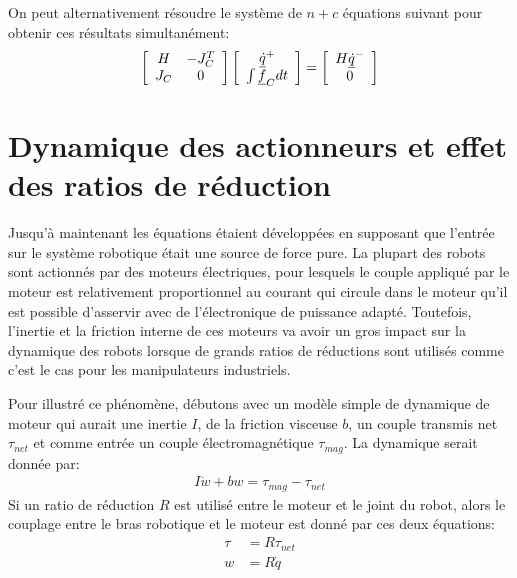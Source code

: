 On peut alternativement résoudre le système de $n+c$ équations suivant pour obtenir ces résultats simultanément:
\begin{align}
\left[ \begin{array}{c c } 	H & -J_C^T  \\ J_C 	& 0  	\end{array} \right] \left[ \begin{array}{c} \underline{\dot{q}}^+  \\ \int{ \underline{f}_C dt }\end{array} \right] = \left[ \begin{array}{c}  	H \underline{\dot{q}}^-   \\ 0  \end{array} \right]
\label{eq:manipulator_impact_eom}
\end{align}



\newpage
\section{Dynamique des actionneurs et effet des ratios de réduction}
\label{sec:actuatordynamic}

Jusqu'à maintenant les équations étaient développées en supposant que l'entrée sur le système robotique était une source de force pure. La plupart des robots sont actionnés par des moteurs électriques, pour lesquels le couple appliqué par le moteur est relativement proportionnel au courant qui circule dans le moteur qu'il est possible d'asservir avec de l'électronique de puissance adapté. Toutefois, l'inertie et la friction interne de ces moteurs va avoir un gros impact sur la dynamique des robots lorsque de grands ratios de réductions sont utilisés comme c'est le cas pour les manipulateurs industriels.

Pour illustré ce phénomène, débutons avec un modèle simple de dynamique de moteur qui aurait une inertie $I$, de la friction visceuse $b$, un couple transmis net $\tau_{net}$ et comme entrée un couple électromagnétique $\tau_{mag}$. La dynamique serait donnée par:
\begin{align}
I \dot{w} + b w  = \tau_{mag} - \tau_{net}
\end{align}
Si un ratio de réduction $R$ est utilisé entre le moteur et le joint du robot, alors le couplage entre le bras robotique et le moteur est donné par ces deux équations:
\begin{align}
\tau &= R \tau_{net} \\
 w   &= R \dot{q}
\end{align}

